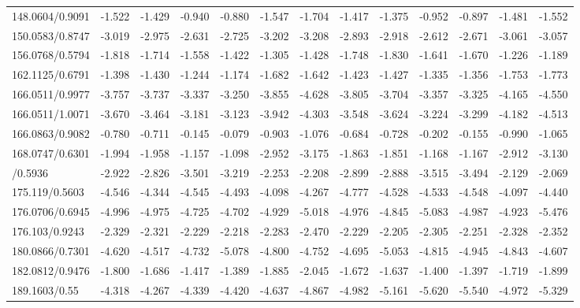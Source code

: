 \documentclass[]{elsarticle} %
\begin{document}
\begin{table}[H]
{\begin{tabular}[t]{lrrrrrrrrrrrr}
148.0604/0.9091 & -1.522 & -1.429 & -0.940 & -0.880 & -1.547 & -1.704 & -1.417 & -1.375 & -0.952 & -0.897 & -1.481 & -1.552\\
\rowcolor{gray!6}  150.0583/0.8747 & -3.019 & -2.975 & -2.631 & -2.725 & -3.202 & -3.208 & -2.893 & -2.918 & -2.612 & -2.671 & -3.061 & -3.057\\
156.0768/0.5794 & -1.818 & -1.714 & -1.558 & -1.422 & -1.305 & -1.428 & -1.748 & -1.830 & -1.641 & -1.670 & -1.226 & -1.189\\
\addlinespace
\rowcolor{gray!6}  162.1125/0.6791 & -1.398 & -1.430 & -1.244 & -1.174 & -1.682 & -1.642 & -1.423 & -1.427 & -1.335 & -1.356 & -1.753 & -1.773\\
166.0511/0.9977 & -3.757 & -3.737 & -3.337 & -3.250 & -3.855 & -4.628 & -3.805 & -3.704 & -3.357 & -3.325 & -4.165 & -4.550\\
\rowcolor{gray!6}  166.0511/1.0071 & -3.670 & -3.464 & -3.181 & -3.123 & -3.942 & -4.303 & -3.548 & -3.624 & -3.224 & -3.299 & -4.182 & -4.513\\
166.0863/0.9082 & -0.780 & -0.711 & -0.145 & -0.079 & -0.903 & -1.076 & -0.684 & -0.728 & -0.202 & -0.155 & -0.990 & -1.065\\
\rowcolor{gray!6}  168.0747/0.6301 & -1.994 & -1.958 & -1.157 & -1.098 & -2.952 & -3.175 & -1.863 & -1.851 & -1.168 & -1.167 & -2.912 & -3.130\\
\addlinespace
170.0924/0.5936 & -2.922 & -2.826 & -3.501 & -3.219 & -2.253 & -2.208 & -2.899 & -2.888 & -3.515 & -3.494 & -2.129 & -2.069\\
\rowcolor{gray!6}  175.119/0.5603 & -4.546 & -4.344 & -4.545 & -4.493 & -4.098 & -4.267 & -4.777 & -4.528 & -4.533 & -4.548 & -4.097 & -4.440\\
176.0706/0.6945 & -4.996 & -4.975 & -4.725 & -4.702 & -4.929 & -5.018 & -4.976 & -4.845 & -5.083 & -4.987 & -4.923 & -5.476\\
\rowcolor{gray!6}  176.103/0.9243 & -2.329 & -2.321 & -2.229 & -2.218 & -2.283 & -2.470 & -2.229 & -2.205 & -2.305 & -2.251 & -2.328 & -2.352\\
180.0866/0.7301 & -4.620 & -4.517 & -4.732 & -5.078 & -4.800 & -4.752 & -4.695 & -5.053 & -4.815 & -4.945 & -4.843 & -4.607\\
\addlinespace
\rowcolor{gray!6}  182.0812/0.9476 & -1.800 & -1.686 & -1.417 & -1.389 & -1.885 & -2.045 & -1.672 & -1.637 & -1.400 & -1.397 & -1.719 & -1.899\\
189.1603/0.55 & -4.318 & -4.267 & -4.339 & -4.420 & -4.637 & -4.867 & -4.982 & -5.161 & -5.620 & -5.540 & -4.972 & -5.329\\

\end{tabular}}
\end{table}
\end{document}
